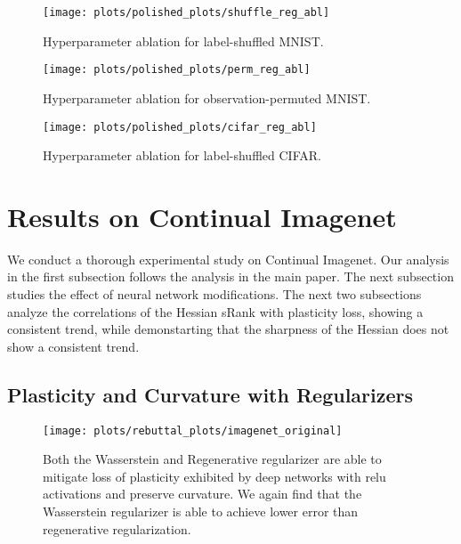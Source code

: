 \begin{figure}[h!]
  \centering
  \texttt{[image: plots/polished\_plots/shuffle\_reg\_abl]}
    \caption{Hyperparameter ablation for label-shuffled MNIST.}
  \label{fig:shuffle_reg_ablation}
\end{figure}

\begin{figure}[h!]
  \centering
  \texttt{[image: plots/polished\_plots/perm\_reg\_abl]}
    \caption{Hyperparameter ablation for observation-permuted MNIST.}
  \label{fig:perm_reg_ablation}
\end{figure}

\begin{figure}[h!]
  \centering
  \texttt{[image: plots/polished\_plots/cifar\_reg\_abl]}
    \caption{Hyperparameter ablation for label-shuffled CIFAR.}
  \label{fig:cifar_reg_ablation}
\end{figure}



\clearpage

\section{Results on Continual Imagenet}
We conduct a thorough experimental study on Continual Imagenet. Our analysis in the first subsection follows the analysis in the main paper. The next subsection studies the effect of neural network modifications. The next two subsections analyze the correlations of the Hessian sRank with plasticity loss, showing a consistent trend, while demonstarting that the sharpness of the Hessian does not show a consistent trend.

\subsection{Plasticity and Curvature with Regularizers}


\begin{figure}[h!]
  \centering
  \texttt{[image: plots/rebuttal\_plots/imagenet\_original]}
  \caption{
     Both the Wasserstein and Regenerative regularizer are able to mitigate loss of plasticity exhibited by deep networks with relu activations and preserve curvature. We again find that the Wasserstein regularizer is able to achieve lower error than regenerative regularization.
  }
  \label{fig:imagenet_og_results}
\end{figure}


